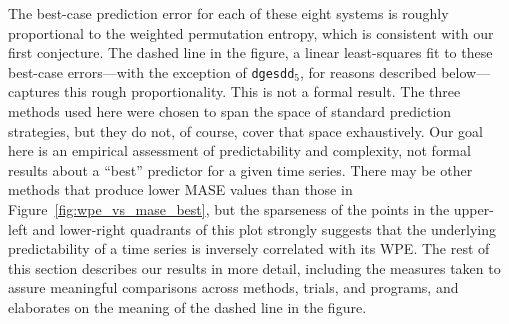 The best-case prediction error for each of these eight systems is
roughly proportional to the weighted permutation entropy, which is
consistent with our first conjecture.  The dashed line in the figure,
a linear least-squares fit to these best-case errors---with the
exception of {\tt dgesdd$_5$}, for reasons described below---captures
this rough proportionality.  This is not a formal result.  The three
methods used here were chosen to span the space of standard prediction
strategies, but they do not, of course, cover that space exhaustively.
Our goal here is an empirical assessment of predictability and
complexity, not formal results about a ``best'' predictor for a given
time series.  There may be other methods that produce lower MASE
values than those in Figure~\ref{fig:wpe_vs_mase_best}, but the
sparseness of the points in the upper-left and lower-right quadrants
of this plot strongly suggests that the underlying predictability of a
time series is inversely correlated with its WPE.  The rest of this
section describes our results in more detail, including the measures
taken to assure meaningful comparisons across methods, trials, and
programs, and elaborates on the meaning of the dashed line in the
figure.

